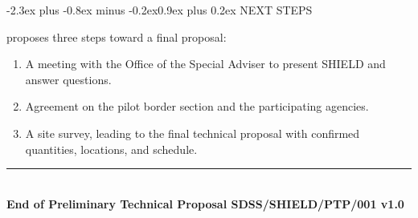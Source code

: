 \documentclass[10pt,letterpaper]{article}
\makeatletter
\renewcommand\section{\@startsection{section}{1}{0pt}%
  {-2.3ex plus -0.8ex minus -0.2ex}{0.9ex plus 0.2ex}%
  {\color{SDSSNavy}\large\bfseries}}
\makeatother
\begin{document}
\section{NEXT STEPS}

\CompanyShort{} proposes three steps toward a final proposal:

\begin{enumerate}[leftmargin=2em,itemsep=6pt]
  \item A meeting with the Office of the Special Adviser to present SHIELD and answer questions.
  \item Agreement on the pilot border section and the participating agencies.
  \item A site survey, leading to the final technical proposal with confirmed quantities, locations, and schedule.
\end{enumerate}

\vfill
\begin{center}
  {\color{SDSSNavy}\rule{0.7\textwidth}{0.6pt}}\\[7pt]
  {\color{SDSSNavy}\bfseries End of Preliminary Technical Proposal SDSS/SHIELD/PTP/001 v1.0}
\end{center}
\end{document}
